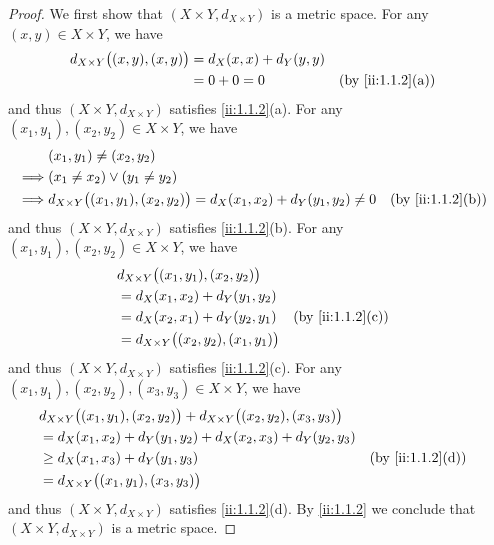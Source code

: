 \begin{proof}
  We first show that \((X \times Y, d_{X \times Y})\) is a metric space.
  For any \((x, y) \in X \times Y\), we have
  \begin{align*}
    d_{X \times Y}\big((x, y), (x, y)\big) & = d_X(x, x) + d_Y(y, y)                       \\
                                           & = 0 + 0 = 0             &  & \by{ii:1.1.2}[a]
  \end{align*}
  and thus \((X \times Y, d_{X \times Y})\) satisfies \cref{ii:1.1.2}(a).
  For any \((x_1, y_1), (x_2, y_2) \in X \times Y\), we have
  \begin{align*}
             & (x_1, y_1) \neq (x_2, y_2)                                                                                  \\
    \implies & (x_1 \neq x_2) \lor (y_1 \neq y_2)                                                                          \\
    \implies & d_{X \times Y}\big((x_1, y_1), (x_2, y_2)\big) = d_X(x_1, x_2) + d_Y(y_1, y_2) \neq 0 &  & \by{ii:1.1.2}[b]
  \end{align*}
  and thus \((X \times Y, d_{X \times Y})\) satisfies \cref{ii:1.1.2}(b).
  For any \((x_1, y_1), (x_2, y_2) \in X \times Y\), we have
  \begin{align*}
     & d_{X \times Y}\big((x_1, y_1), (x_2, y_2)\big)                         \\
     & = d_X(x_1, x_2) + d_Y(y_1, y_2)                                        \\
     & = d_X(x_2, x_1) + d_Y(y_2, y_1)                  &  & \by{ii:1.1.2}[c] \\
     & = d_{X \times Y}\big((x_2, y_2), (x_1, y_1)\big)
  \end{align*}
  and thus \((X \times Y, d_{X \times Y})\) satisfies \cref{ii:1.1.2}(c).
  For any \((x_1, y_1), (x_2, y_2), (x_3, y_3) \in X \times Y\), we have
  \begin{align*}
     & d_{X \times Y}\big((x_1, y_1), (x_2, y_2)\big) + d_{X \times Y}\big((x_2, y_2), (x_3, y_3)\big)                       \\
     & = d_X(x_1, x_2) + d_Y(y_1, y_2) + d_X(x_2, x_3) + d_Y(y_2, y_3)                                                       \\
     & \geq d_X(x_1, x_3) + d_Y(y_1, y_3)                                                              &  & \by{ii:1.1.2}[d] \\
     & = d_{X \times Y}\big((x_1, y_1), (x_3, y_3)\big)
  \end{align*}
  and thus \((X \times Y, d_{X \times Y})\) satisfies \cref{ii:1.1.2}(d).
  By \cref{ii:1.1.2} we conclude that \((X \times Y, d_{X \times Y})\) is a metric space.


\end{proof}
